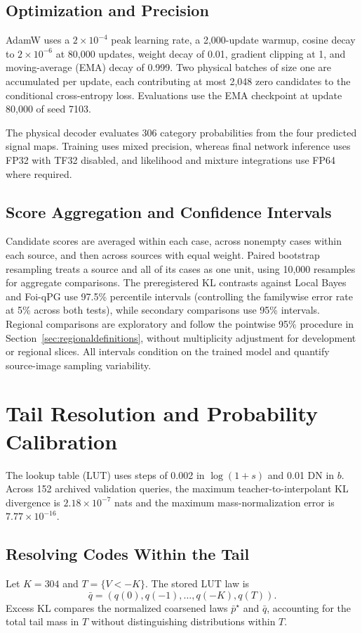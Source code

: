 \documentclass[10pt,twocolumn,journal]{IEEEtran}
\begin{document}
\subsection{Optimization and Precision}
AdamW uses a $2\times10^{-4}$ peak learning rate, a 2,000-update warmup, cosine decay to $2\times10^{-6}$ at 80,000 updates, weight decay of 0.01, gradient clipping at 1, and moving-average (EMA) decay of 0.999. Two physical batches of size one are accumulated per update, each contributing at most 2,048 zero candidates to the conditional cross-entropy loss. Evaluations use the EMA checkpoint at update 80,000 of seed 7103.

The physical decoder evaluates 306 category probabilities from the four predicted signal maps. Training uses mixed precision, whereas final network inference uses FP32 with TF32 disabled, and likelihood and mixture integrations use FP64 where required.

\subsection{Score Aggregation and Confidence Intervals}\label{sec:scoreaggregation}
Candidate scores are averaged within each case, across nonempty cases within each source, and then across sources with equal weight. Paired bootstrap resampling treats a source and all of its cases as one unit, using 10,000 resamples for aggregate comparisons. The preregistered KL contrasts against Local Bayes and Foi-qPG use 97.5\% percentile intervals (controlling the familywise error rate at 5\% across both tests), while secondary comparisons use 95\% intervals. Regional comparisons are exploratory and follow the pointwise 95\% procedure in Section~\ref{sec:regionaldefinitions}, without multiplicity adjustment for development or regional slices. All intervals condition on the trained model and quantify source-image sampling variability.

\section{Tail Resolution and Probability Calibration}
The lookup table (LUT) uses steps of 0.002 in $\log(1+s)$ and 0.01 DN in $b$. Across 152 archived validation queries, the maximum teacher-to-interpolant KL divergence is $2.18\times10^{-7}$ nats and the maximum mass-normalization error is $7.77\times10^{-16}$.

\subsection{Resolving Codes Within the Tail}
Let $K=304$ and $T=\{V<-K\}$. The stored LUT law is
\begin{equation}
\bar q=(q(0),q(-1),\ldots,q(-K),q(T)).
\end{equation}
Excess KL compares the normalized coarsened laws $\bar p^\star$ and $\bar q$, accounting for the total tail mass in $T$ without distinguishing distributions within $T$.
\end{document}
